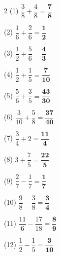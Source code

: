 \documentclass[a4paper, 11pt]{ltjsarticle}
\begin{document}
\hfill


\vspace*{5ex}

\begin{multicols*}{2}
\noindent (1) \quad $\dfrac{3}{8}+\dfrac{4}{8} = \mathbf{\dfrac{7}{8}}$
\vspace*{\fill}

\noindent (2) \quad $\dfrac{1}{6}+\dfrac{2}{6} = \mathbf{\dfrac{1}{2}}$
\vspace*{\fill}

\noindent (3) \quad $\dfrac{1}{2}+\dfrac{5}{6} = \mathbf{\dfrac{4}{3}}$
\vspace*{\fill}

\noindent (4) \quad $\dfrac{1}{2}+\dfrac{1}{5} = \mathbf{\dfrac{7}{10}}$
\vspace*{\fill}

\noindent (5) \quad $\dfrac{5}{6}+\dfrac{3}{5} = \mathbf{\dfrac{43}{30}}$
\vspace*{\fill}

\noindent (6) \quad $\dfrac{3}{10}+\dfrac{5}{8} = \mathbf{\dfrac{37}{40}}$
\vspace*{\fill}

\noindent (7) \quad $\dfrac{3}{4}+2 = \mathbf{\dfrac{11}{4}}$
\vspace*{\fill}

\noindent (8) \quad $3+\dfrac{7}{5} = \mathbf{\dfrac{22}{5}}$
\vspace*{\fill}
\columnbreak

\noindent (9) \quad $\dfrac{2}{7}-\dfrac{1}{7} = \mathbf{\dfrac{1}{7}}$
\vspace*{\fill}

\noindent (10) \quad $\dfrac{9}{8}-\dfrac{3}{8} = \mathbf{\dfrac{3}{4}}$
\vspace*{\fill}

\noindent (11) \quad $\dfrac{11}{6}-\dfrac{17}{18} = \mathbf{\dfrac{8}{9}}$
\vspace*{\fill}

\noindent (12) \quad $\dfrac{1}{2}-\dfrac{1}{5} = \mathbf{\dfrac{3}{10}}$
\vspace*{\fill}


\end{multicols*}
\end{document}
